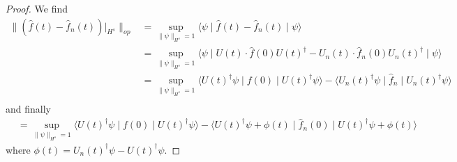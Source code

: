 \documentclass[final,leqno]{siamltex1213}
\begin{document}
\begin{proof}
	We find
	\begin{align}
		\| ( \hat{f}(t) - \hat{f}_{n}(t))|_{H^{s}} \|_{op} &= \sup_{\| \psi \|_{H^{s}} =1} \langle \psi \mid \hat{f}(t) - \hat{f}_{n}(t) \mid \psi \rangle \\
			&= \sup_{ \| \psi \|_{H^{s}} =1} \langle \psi \mid U(t) \cdot \hat{f}(0) U(t)^{\dagger} - U_{n}(t) \cdot \hat{f}_{n}(0) U_{n}(t)^{\dagger} \mid \psi \rangle \\
			&= \sup_{ \| \psi \|_{H^{s}} =1 } \langle U(t)^{\dagger} \psi \mid f(0) \mid U(t)^{\dagger} \psi \rangle 
				- \langle U_{n}(t)^{\dagger} \psi \mid \hat{f}_{n} \mid U_{n}(t)^{\dagger} \psi \rangle\\
	\end{align}
	and finally
	\begin{align}
			&= \sup_{ \| \psi \|_{H^{s}} = 1} \langle U(t)^{\dagger} \psi \mid f(0) \mid U(t)^{\dagger} \psi \rangle 
			- \langle U(t)^{\dagger} \psi + \phi(t) \mid \hat{f}_{n}(0) \mid  U(t)^{\dagger} \psi + \phi(t) \rangle \label{eq:final line}
	\end{align}
	where $\phi(t) = U_{n}(t)^{\dagger} \psi - U(t)^{\dagger} \psi$.
	

\end{proof}
\end{document}

